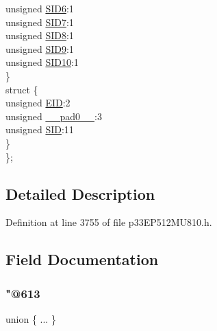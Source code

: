 \begin{DoxyCompactItemize}
\begin{tabbing}
\>\>unsigned \hyperlink{structtag_c1_r_x_f1_s_i_d_b_i_t_s_a70d70952133eb2389d5c326f9f0e8035}{SID6}:1\\
\>\>unsigned \hyperlink{structtag_c1_r_x_f1_s_i_d_b_i_t_s_a34097fb76decd431701fa2d86a22328e}{SID7}:1\\
\>\>unsigned \hyperlink{structtag_c1_r_x_f1_s_i_d_b_i_t_s_afe74894633244fdb0b0c01b4e8c522e7}{SID8}:1\\
\>\>unsigned \hyperlink{structtag_c1_r_x_f1_s_i_d_b_i_t_s_a33587704948067005c2a6a3ccc503c99}{SID9}:1\\
\>\>unsigned \hyperlink{structtag_c1_r_x_f1_s_i_d_b_i_t_s_a1a9084031c7f5fb16007feeebf0d8216}{SID10}:1\\
\>\} \\
\>struct \{\\
\>\>unsigned \hyperlink{structtag_c1_r_x_f1_s_i_d_b_i_t_s_ae80b378c9141f7c03e0b4e55b5f4b54d}{EID}:2\\
\>\>unsigned \hyperlink{structtag_c1_r_x_f1_s_i_d_b_i_t_s_adf71f3d8410c1f1dbbc96680a92c49af}{\_\_pad0\_\_}:3\\
\>\>unsigned \hyperlink{structtag_c1_r_x_f1_s_i_d_b_i_t_s_af88edf93b2fee2432665bd84f51287e4}{SID}:11\\
\>\} \\
\}; \\

\end{tabbing}\end{DoxyCompactItemize}


\subsection{Detailed Description}


Definition at line 3755 of file p33\+E\+P512\+M\+U810.\+h.



\subsection{Field Documentation}
\mbox{\label{structtag_c1_r_x_f1_s_i_d_b_i_t_s_a9ce68bc76904f9194e392d9f2e44743f}} 
\subsubsection{\texorpdfstring{"@613}{@613}}
{\footnotesize\ttfamily union \{ ... \} }

\mbox{\label{structtag_c1_r_x_f1_s_i_d_b_i_t_s_adf71f3d8410c1f1dbbc96680a92c49af}} 
